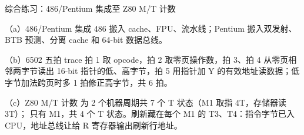 \begin{chapteranswer}{综合练习：486/Pentium 集成至 Z80 M/T 计数}
\begin{answersubproblem}{（a）486/Pentium 集成}
486 搬入 cache、FPU、流水线；Pentium 搬入双发射、BTB 预测、分离 cache 和 64-bit 数据总线。
\end{answersubproblem}
\begin{answersubproblem}{（b）6502 五拍 trace}
拍 1 取 opcode，拍 2 取零页操作数，拍 3、拍 4 从零页相邻两字节读出 16-bit 指针的低、高字节，拍 5 用指针加 Y 的有效地址读数据；低字节加法跨页时多 1 拍修正高字节，共 6 拍。
\end{answersubproblem}
\begin{answersubproblem}{（c）Z80 M/T 计数}
 为 2 个机器周期共 7 个 T 状态（M1 取指 4T，存储器读 3T）； 只有 M1，共 4 个 T 状态。刷新藏在每个 M1 的 T3、T4：指令字节已入 CPU，地址总线让给 R 寄存器输出刷新行地址。
\end{answersubproblem}
\end{chapteranswer}
